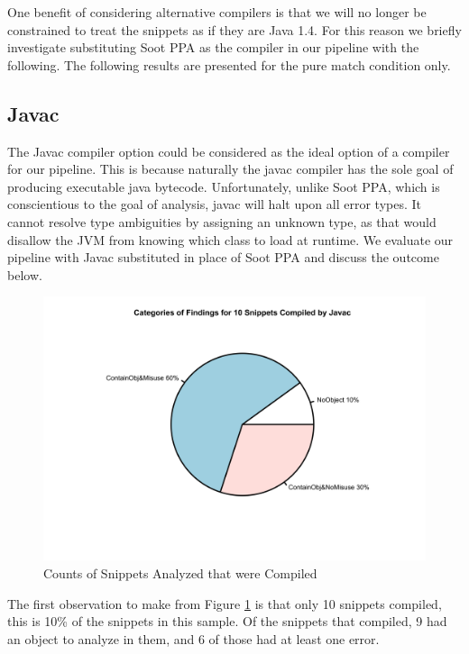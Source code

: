 \documentclass[10pt, conference]{IEEEtran}
\begin{document}
One benefit of considering alternative compilers is that we will no longer be constrained to treat the snippets as if they are Java 1.4. For this reason we briefly investigate substituting Soot PPA as the compiler in our pipeline with the following. The following results are presented for the pure match condition only.

\subsection{Javac}

The Javac compiler option could be considered as the ideal option of a compiler for our pipeline. This is because naturally the javac compiler has the sole goal of producing executable java bytecode. Unfortunately, unlike Soot PPA, which is conscientious to the goal of analysis, javac will halt upon all error types. It cannot resolve type ambiguities by assigning an unknown type, as that would disallow the JVM from knowing which class to load at runtime. We evaluate our pipeline with Javac substituted in place of Soot PPA and discuss the outcome below.

\begin{figure}[h]
\begin{center}
\includegraphics[width=0.9\linewidth]{PieJavaC.png}
\caption{Counts of Snippets Analyzed that were Compiled \label{fig:javacPie}}
\end{center}
\end{figure}

The first observation to make from Figure \ref{fig:javacPie} is that only 10 snippets compiled, this is 10\% of the snippets in this sample. Of the snippets that compiled, 9 had an object to analyze in them, and 6 of those had at least one error.
\end{document}
